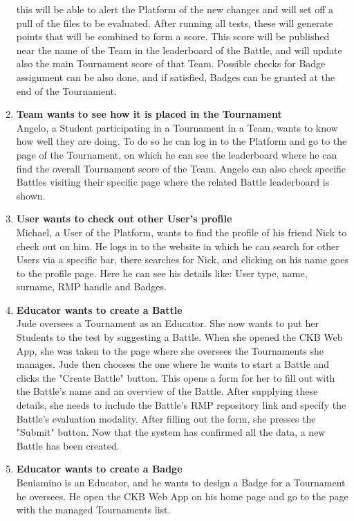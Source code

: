 \begin{enumerate}[label= \textbf{SC\arabic*}]
    this will be able to alert the Platform of the new changes and will set off a pull of the files to be evaluated. After running all tests, these will generate points that will be combined to form a score. This score will be 
    published near the name of the Team in the leaderboard of the Battle, and will update also the main Tournament score of that Team. Possible checks for Badge assignment can be also done, and if satisfied, Badges can be granted at 
    the end of the Tournament.
    \item \textbf{Team wants to see how it is placed in the Tournament} \label{sc:sc9} \\ Angelo, a Student participating in a Tournament in a Team, wants to know how well they are doing. To do so he can log in to the Platform and go to the page 
    of the Tournament, on which he can see the leaderboard where he can find the overall Tournament score of the Team. Angelo can also check specific Battles visiting their specific page where the related Battle leaderboard is shown.
    \item \textbf{User wants to check out other User's profile} \label{sc:sc10} \\ Michael, a User of the Platform, wants to find the profile of his friend Nick to check out on him. He logs in to the website in which he can search for other Users 
    via a specific bar, there searches for Nick, and clicking on his name goes to the profile page. Here he can see his details like: User type, name, surname, RMP handle and Badges.
    \item \textbf{Educator wants to create a Battle} \label{sc:sc11} \\Jude oversees a Tournament as an Educator. She now wants to put her Students to the test by suggesting a Battle. When she opened the CKB Web App, she was taken to the page where she 
    oversees the Tournaments she manages. Jude then chooses the one where he wants to start a Battle and clicks the "Create Battle" button. This opens a form for her to fill out with the Battle's name and an overview of the Battle. 
    After supplying these details, she needs to include the Battle's RMP repository link and specify the Battle's evaluation modality. After filling out the form, she presses the "Submit" button. Now that the system has confirmed all 
    the data, a new Battle has been created.
    \item \textbf{Educator wants to create a Badge} \label{sc:sc12} \\Beniamino is an Educator, and he wants to design a Badge for a Tournament he oversees. He open the CKB Web App on his home page and go to the page with the managed Tournaments list.

\end{enumerate}

